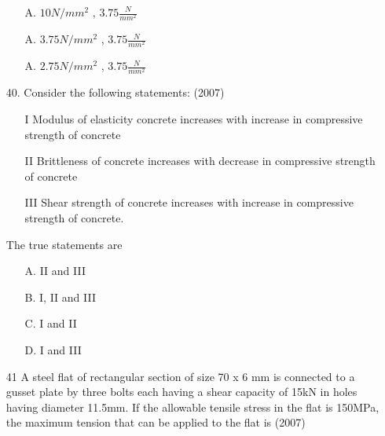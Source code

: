 \documentclass[journal]{IEEEtran}
\begin{document}
\begin{enumerate}
\begin{enumerate}
    \item [A.] $10N/mm^2$ , $3.75\frac{N}{mm^2}$
    \item [A.] $3.75N/mm^2$ , $3.75\frac{N}{mm^2}$ 
    \item [A.] $2.75N/mm^2$ , $3.75\frac{N}{mm^2}$ 
  \end{enumerate}
  \item[40.] Consider the following statements: \hfill (2007)
  \begin{enumerate}
    \item [I] Modulus of elasticity concrete increases with increase in compressive
    strength of concrete
    \item [II] Brittleness of concrete increases with decrease in compressive strength of
    concrete
    \item [III] Shear strength of concrete increases with increase in compressive strength
    of concrete. 
  \end{enumerate}
  The true statements are 
  \begin{enumerate}
    \item [A.] II and III
    \item [B.] I, II and III
    \item [C.] I and II
    \item [D.] I and III
  \end{enumerate}
  \item[41]  A steel flat of rectangular section of size 70 x 6 mm is connected to a gusset plate
  by three bolts each having a shear capacity of 15kN in holes having diameter
  11.5mm. If the allowable tensile stress in the flat is 150MPa, the maximum
  tension that can be applied to the flat is \hfill (2007)
  \begin{figure}[!ht]
    \centering
\end{figure}
\end{enumerate}
\end{document}
